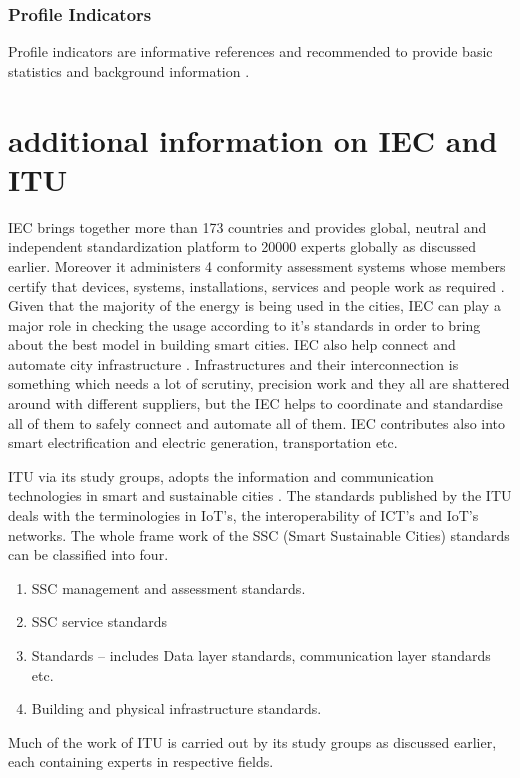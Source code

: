 \documentclass[sigconf]{acmart}
\begin{document}
\subsubsection{\textbf{Profile Indicators}}
Profile indicators are informative references and recommended to provide basic statistics and background information \citep{whataresmartcities}.

\section{additional information on IEC and ITU }
\par IEC brings together more than 173 countries and provides global, neutral and independent standardization platform to 20000 experts globally as discussed earlier. Moreover it administers 4 conformity assessment systems whose members certify that devices, systems, installations, services and people work as required \citep{IEC}. Given that the majority of the energy is being used in the cities, IEC can play a major role in checking the usage according to it's standards in order to bring about the best model in building smart cities. IEC also help connect and automate city infrastructure \citep{IEC}. Infrastructures and their interconnection is something which needs a lot of scrutiny, precision work and they all are shattered around with different suppliers, but the IEC helps to coordinate and standardise all of them to safely connect and automate all of them. IEC contributes also into smart electrification and electric generation, transportation etc.
\par ITU via its study groups, adopts the information and communication technologies in smart and sustainable cities \citep{sang2019itu}. The standards published by the ITU deals with the terminologies in IoT's, the interoperability of ICT's and IoT's networks. The whole frame work of the SSC (Smart Sustainable Cities) standards can be classified into four.
\begin{enumerate}
\item SSC management and assessment standards.
\item SSC service standards
\item Standards – includes Data layer standards, communication layer standards etc.
\item Building and physical infrastructure standards.
\end{enumerate}

Much of the work of ITU is carried out by its study groups as discussed earlier, each containing experts in respective fields.
\end{document}
